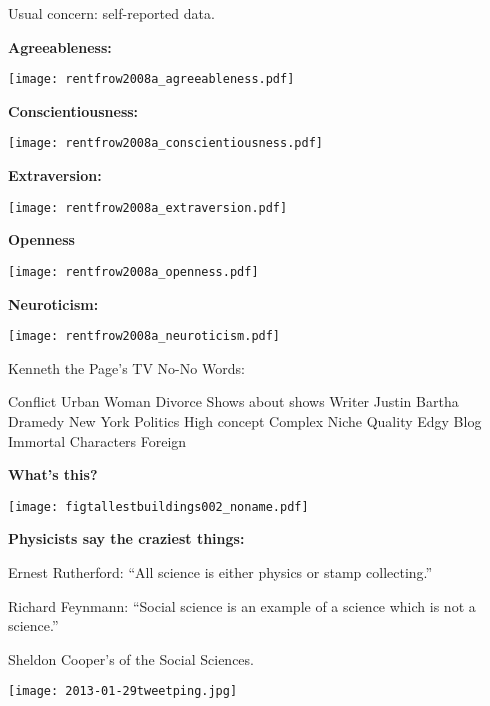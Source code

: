     {
      \alert{Usual concern:} self-reported data.
    }
  


  \textbf{Agreeableness:}

  \texttt{[image: rentfrow2008a\_agreeableness.pdf]}


  \textbf{Conscientiousness:}

  \texttt{[image: rentfrow2008a\_conscientiousness.pdf]}


  \textbf{Extraversion:}

  \texttt{[image: rentfrow2008a\_extraversion.pdf]}


  \textbf{Openness}

  \texttt{[image: rentfrow2008a\_openness.pdf]}


  \textbf{Neuroticism:}

  \texttt{[image: rentfrow2008a\_neuroticism.pdf]}



  
Kenneth the Page's TV No-No Words:

Conflict
Urban
Woman
Divorce
Shows about shows
Writer
Justin Bartha
Dramedy
New York
Politics
High concept
Complex
Niche
Quality
Edgy
Blog
Immortal Characters
Foreign




  \textbf{What's this?}
  
  \texttt{[image: figtallestbuildings002\_noname.pdf]}





  \textbf{Physicists say the craziest things:}
    
    
      Ernest Rutherford:
      ``All science is either physics or stamp collecting.''
    
      Richard Feynmann:
      ``Social science is an example of a science which is not a science.''
    
      Sheldon Cooper's 
      of the Social Sciences.
    

  




  \textbf{}
    \texttt{[image: 2013-01-29tweetping.jpg]}
  


